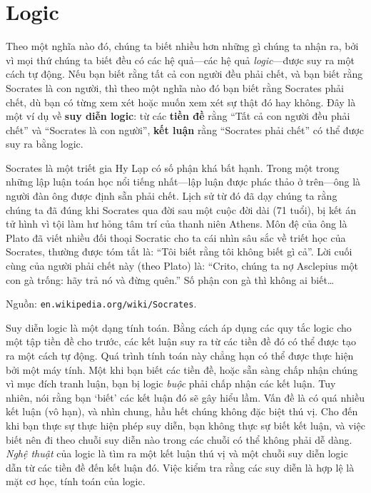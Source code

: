 \chapter{Logic}

Theo một nghĩa nào đó, chúng ta biết nhiều hơn những gì chúng ta nhận ra, bởi vì mọi thứ chúng ta biết đều có các hệ quả---các hệ quả \emph{logic}---được suy ra một cách tự động. Nếu bạn biết rằng tất cả con người đều phải chết, và bạn biết rằng Socrates là con người, thì theo một nghĩa nào đó bạn biết rằng Socrates phải chết, dù bạn có từng xem xét hoặc muốn xem xét sự thật đó hay không. Đây là một ví dụ về \textbf{suy diễn logic}: từ các \textbf{tiền đề} rằng ``Tất cả con người đều phải chết'' và ``Socrates là con người'', \textbf{kết luận} rằng ``Socrates phải chết'' có thể được suy ra bằng logic.

\begin{infobox}
Socrates là một triết gia Hy Lạp có số phận khá bất hạnh. Trong một trong những lập luận toán học nổi tiếng nhất---lập luận được phác thảo ở trên---ông là người đàn ông được định sẵn phải chết. Lịch sử từ đó đã dạy chúng ta rằng chúng ta đã đúng khi Socrates qua đời sau một cuộc đời dài (71 tuổi), bị kết án tử hình vì tội làm hư hỏng tâm trí của thanh niên Athens. Môn đệ của ông là Plato đã viết nhiều đối thoại Socratic cho ta cái nhìn sâu sắc về triết học của Socrates, thường được tóm tắt là: ``Tôi biết rằng tôi không biết gì cả''. Lời cuối cùng của người phải chết này (theo Plato) là: ``Crito, chúng ta nợ Asclepius một con gà trống: hãy trả nó và đừng quên.'' Số phận con gà thì không ai biết\ldots

Nguồn: \texttt{en.wikipedia.org/wiki/Socrates}.
\end{infobox}

Suy diễn logic là một dạng tính toán. Bằng cách áp dụng các quy tắc logic cho một tập tiền đề cho trước, các kết luận suy ra từ các tiền đề đó có thể được tạo ra một cách tự động. Quá trình tính toán này chẳng hạn có thể được thực hiện bởi một máy tính. Một khi bạn biết các tiền đề, hoặc sẵn sàng chấp nhận chúng vì mục đích tranh luận, bạn bị logic \emph{buộc} phải chấp nhận các kết luận. Tuy nhiên, nói rằng bạn `biết' các kết luận đó sẽ gây hiểu lầm. Vấn đề là có quá nhiều kết luận (vô hạn), và nhìn chung, hầu hết chúng không đặc biệt thú vị. Cho đến khi bạn thực sự thực hiện phép suy diễn, bạn không thực sự biết kết luận, và việc biết nên đi theo chuỗi suy diễn nào trong các chuỗi có thể không phải dễ dàng. \emph{Nghệ thuật} của logic là tìm ra một kết luận thú vị và một chuỗi suy diễn logic dẫn từ các tiền đề đến kết luận đó. Việc kiểm tra rằng các suy diễn là hợp lệ là mặt cơ học, tính toán của logic.

